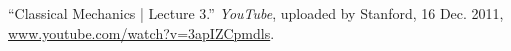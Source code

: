 \begin{thebibliography}{12}






“Classical Mechanics | Lecture 3.” \emph{YouTube}, uploaded by Stanford, 16 Dec. 2011, \url{www.youtube.com/watch?v=3apIZCpmdls}.







\end{thebibliography}
